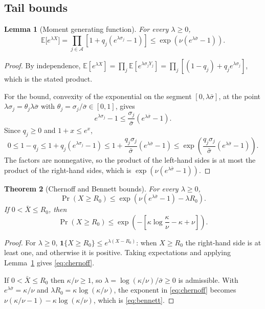 \documentclass[11pt,a4paper]{article}
\newtheorem{theorem}{Theorem}
\newtheorem{lemma}[theorem]{Lemma}
\newcommand{\ind}{\mathbf{1}}
\begin{document}
\subsection{Tail bounds}
\begin{lemma}[Moment generating function]\label{lem:mgf}
For every $\lambda\ge0$,
\begin{equation}
\mathbb E\big[e^{\lambda X}\big]=\prod_{j\in\mathcal A}\left[1+q_j\left(e^{\lambda\sigma_j}-1\right)\right]\le\exp\!\left(\nu\left(e^{\lambda\bar\sigma}-1\right)\right).
\end{equation}
\end{lemma}
\begin{proof}
By independence, $\mathbb E[e^{\lambda X}]=\prod_j\mathbb E[e^{\lambda\sigma_jY_j}]=\prod_j[(1-q_j)+q_je^{\lambda\sigma_j}]$, which is the stated product.

For the bound, convexity of the exponential on the segment $[0,\lambda\bar\sigma]$, at the point $\lambda\sigma_j=\theta_j\lambda\bar\sigma$ with $\theta_j=\sigma_j/\bar\sigma\in[0,1]$, gives
\begin{equation}
e^{\lambda\sigma_j}-1\le\frac{\sigma_j}{\bar\sigma}\left(e^{\lambda\bar\sigma}-1\right).
\end{equation}
Since $q_j\ge0$ and $1+x\le e^x$,
\begin{equation}
0\le1-q_j\le1+q_j\left(e^{\lambda\sigma_j}-1\right)\le1+\frac{q_j\sigma_j}{\bar\sigma}\left(e^{\lambda\bar\sigma}-1\right)\le\exp\!\left(\frac{q_j\sigma_j}{\bar\sigma}\left(e^{\lambda\bar\sigma}-1\right)\right).
\end{equation}
The factors are nonnegative, so the product of the left-hand sides is at most the product of the right-hand sides, which is $\exp(\nu(e^{\lambda\bar\sigma}-1))$.
\end{proof}

\begin{theorem}[Chernoff and Bennett bounds]\label{thm:bennett}
For every $\lambda\ge0$,
\begin{equation}
\Pr(X\ge R_0)\le\exp\!\left(\nu\left(e^{\lambda\bar\sigma}-1\right)-\lambda R_0\right).\label{eq:chernoff}
\end{equation}
If $0<\bar X\le R_0$, then
\begin{equation}
\boxed{\Pr(X\ge R_0)\le\exp\!\left(-\left[\kappa\log\frac{\kappa}{\nu}-\kappa+\nu\right]\right).}\label{eq:bennett}
\end{equation}
\end{theorem}
\begin{proof}
For $\lambda\ge0$, $\ind\{X\ge R_0\}\le e^{\lambda(X-R_0)}$: when $X\ge R_0$ the right-hand side is at least one, and otherwise it is positive. Taking expectations and applying Lemma~\ref{lem:mgf} gives \eqref{eq:chernoff}.

If $0<\bar X\le R_0$ then $\kappa/\nu\ge1$, so $\lambda=\log(\kappa/\nu)/\bar\sigma\ge0$ is admissible. With $e^{\lambda\bar\sigma}=\kappa/\nu$ and $\lambda R_0=\kappa\log(\kappa/\nu)$, the exponent in \eqref{eq:chernoff} becomes $\nu(\kappa/\nu-1)-\kappa\log(\kappa/\nu)$, which is \eqref{eq:bennett}.
\end{proof}
\end{document}
